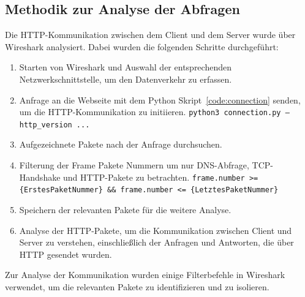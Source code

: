 \FloatBarrier{}
\subsection{Methodik zur Analyse der Abfragen}

Die HTTP-Kommunikation zwischen dem Client und dem Server wurde über Wireshark analysiert.
Dabei wurden die folgenden Schritte durchgeführt:

\begin{enumerate}\label{enum:wireshark_capture_method}
    \item Starten von Wireshark und Auswahl der entsprechenden Netzwerkschnittstelle, um den Datenverkehr zu erfassen.
    \item Anfrage an die Webseite mit dem Python Skript~\ref{code:connection} senden, um die HTTP-Kommunikation zu initiieren.
    \subitem \texttt{python3 connection.py --http\_version ...}
    \item Aufgezeichnete Pakete nach der Anfrage durchsuchen.
    \item Filterung der Frame Pakete Nummern um nur DNS-Abfrage, TCP-Handshake und HTTP-Pakete zu betrachten.
    \subitem \texttt{frame.number >= \{ErstesPaketNummer\} \&\& frame.number <= \{LetztesPaketNummer\}}
    \item Speichern der relevanten Pakete für die weitere Analyse.
    \item Analyse der HTTP-Pakete, um die Kommunikation zwischen Client und Server zu verstehen, einschließlich der Anfragen und Antworten, die über HTTP gesendet wurden.
\end{enumerate}

Zur Analyse der Kommunikation wurden einige Filterbefehle in Wireshark verwendet, um die relevanten Pakete zu identifizieren und zu isolieren.

